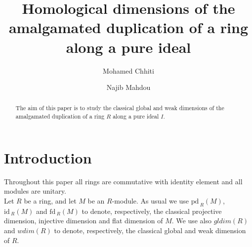 \documentclass{amsart}
\theoremstyle{definition}
\theoremstyle{remark}
\theoremstyle{Definition and Notation}
\begin{document}


\title[Homological dimensions of the amalgamated duplication of a ring...]{Homological dimensions of the amalgamated duplication of a ring along
a pure ideal}

\author{Mohamed Chhiti}
\address{Mohamed Chhiti\\Department of Mathematics, Faculty of Science and Technology of Fez, Box 2202, University S.M. Ben Abdellah Fez, Morocco.\\
chhiti.med@hotmail.com }
\author{Najib Mahdou}
\address{Najib Mahdou\\Department of Mathematics, Faculty of Science and Technology of Fez, Box 2202, University S.M. Ben Abdellah Fez, Morocco.\\
mahdou@hotmail.com }



\begin{abstract}

The aim of this paper is to study the classical  global and weak
dimensions of the  amalgamated duplication of a ring $R$ along a
pure ideal $I$.
\end{abstract}
\maketitle
\section{Introduction}
Throughout this paper all rings are commutative with identity
element and all modules are unitary.\\
Let $R$ be a ring, and let $M$ be an $R$-module. As usual we use
${\mbox{pd}\,}_R(M)$, ${\mbox{id}\,}_R(M)$ and ${\mbox{fd}\,}_R(M)$ to denote, respectively, the
classical projective dimension, injective dimension and flat
dimension of $M$. We use also $gldim(R)$ and $wdim(R)$ to denote,
respectively, the classical global and weak dimension of $R$.\\
\end{document}

